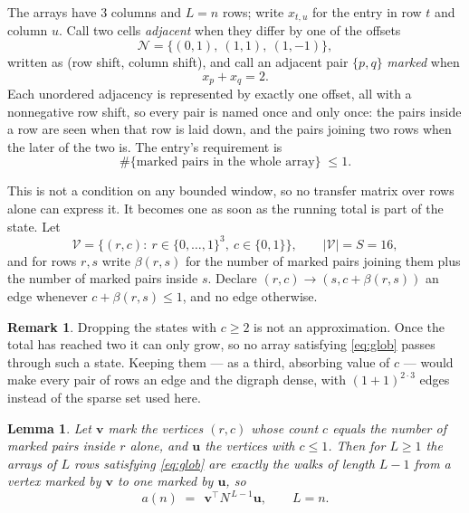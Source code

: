 \documentclass[11pt,a4paper]{article}
\theoremstyle{plain}
\newtheorem{lemma}[theorem]{Lemma}
\theoremstyle{definition}
\newtheorem{remark}[theorem]{Remark}
\begin{document}
The arrays have $3$ columns and $L=n$ rows; write $x_{t,u}$ for the entry in
row $t$ and column $u$. Call two cells \emph{adjacent} when they differ by one of the
offsets
\[
\mathcal N=\{(0,1),\ (1,1),\ (1,-1)\},
\]
written as (row shift, column shift), and call an adjacent pair $\{p,q\}$
\emph{marked} when
\[
x_{p}+x_{q}=2 .
\]
Each unordered adjacency is represented by exactly one offset, all with a nonnegative row
shift, so every pair is named once and only once: the pairs inside a row are seen when
that row is laid down, and the pairs joining two rows when the later of the two is. The
entry's requirement is
\begin{equation}\label{eq:glob}
\#\{\text{marked pairs in the whole array}\}\;\le1.
\end{equation}

This is not a condition on any bounded window, so no transfer matrix over rows alone can
express it. It becomes one as soon as the running total is part of the state. Let
\[
\mathcal V=\bigl\{(r,c):\ r\in\{0,\dots,1\}^{3},\ c\in\{0,1\}\bigr\},
\qquad |\mathcal V|=S=16,
\]
and for rows $r,s$ write $\beta(r,s)$ for the number of marked pairs joining them plus the
number of marked pairs inside $s$. Declare $(r,c)\to(s,c+\beta(r,s))$ an edge whenever
$c+\beta(r,s)\le1$, and no edge otherwise.

\begin{remark}
Dropping the states with $c\ge2$ is not an approximation. Once the total has reached two it
can only grow, so no array satisfying \eqref{eq:glob} passes through such a state. Keeping
them --- as a third, absorbing value of $c$ --- would make every pair of rows an edge and
the digraph dense, with $(1+1)^{2\cdot3}$ edges instead of the sparse set used here.
\end{remark}

\begin{lemma}\label{lem:walk}
Let $\mathbf{v}$ mark the vertices $(r,c)$ whose count $c$ equals the number of marked pairs
inside $r$ alone, and $\mathbf{u}$ the vertices with $c\le1$. Then for $L\ge1$ the arrays
of $L$ rows satisfying \eqref{eq:glob} are exactly the walks of length $L-1$ from a
vertex marked by $\mathbf{v}$ to one marked by $\mathbf{u}$, so
\[
a(n)\;=\;\,\mathbf{v}^{\!\top}N^{\,L-1}\mathbf{u},\qquad L=n .
\]
\end{lemma}
\end{document}
